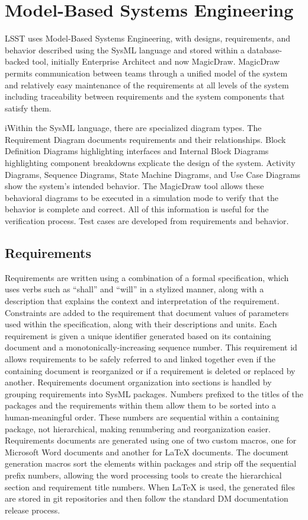 \section{Model-Based Systems Engineering}

LSST uses Model-Based Systems Engineering\cite{2014SPIE.9150E..0MC}, with designs, requirements, and behavior described using the SysML language and stored within a database-backed tool, initially Enterprise Architect and now MagicDraw.
MagicDraw permits communication between teams through a unified model of the system and
relatively easy maintenance of the requirements at all levels of the system including traceability between requirements and the system components that satisfy them.

i\noindent Within the SysML language, there are specialized diagram types.
The Requirement Diagram documents requirements and their relationships.
Block Definition Diagrams highlighting interfaces and Internal Block Diagrams highlighting component breakdowns explicate the design of the system.
Activity Diagrams, Sequence Diagrams, State Machine Diagrams, and Use Case Diagrams show the system's intended behavior.
The MagicDraw tool allows these behavioral diagrams to be executed in a simulation mode to verify that the behavior is complete and correct.
All of this information is useful for the verification process.
Test cases are developed from requirements and behavior.

\subsection{Requirements}

Requirements are written using a combination of a formal specification, which uses verbs such as ``shall'' and ``will'' in a stylized manner, along with a description that explains the context and interpretation of the requirement.
Constraints are added to the requirement that document values of parameters used within the specification, along with their descriptions and units.
Each requirement is given a unique identifier generated based on its containing document and a monotonically-increasing sequence number.
This requirement id allows requirements to be safely referred to and linked together even if the containing document is reorganized or if a requirement is deleted or replaced by another.
Requirements document organization into sections is handled by grouping requirements into SysML packages.
Numbers prefixed to the titles of the packages and the requirements within them allow them to be sorted into a human-meaningful order.
These numbers are sequential within a containing package, not hierarchical, making renumbering and reorganization easier.
Requirements documents are generated using one of two custom macros, one for Microsoft Word documents and another for LaTeX documents.
The document generation macros sort the elements within packages and strip off the sequential prefix numbers, allowing the word processing tools to create the hierarchical section and requirement title numbers.
When LaTeX is used, the generated files are stored in git repositories and then follow the standard DM documentation release process.

